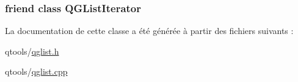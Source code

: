 \subsubsection[{Q\+G\+List\+Iterator}]{\setlength{\rightskip}{0pt plus 5cm}friend class {\bf Q\+G\+List\+Iterator}\hspace{0.3cm}{\ttfamily [friend]}}\label{class_q_l_node_a13dc100371e8931a394e57af8df9fbb3}


La documentation de cette classe a été générée à partir des fichiers suivants \+:\begin{DoxyCompactItemize}
\item 
qtools/\hyperlink{qglist_8h}{qglist.\+h}\item 
qtools/\hyperlink{qglist_8cpp}{qglist.\+cpp}\end{DoxyCompactItemize}
